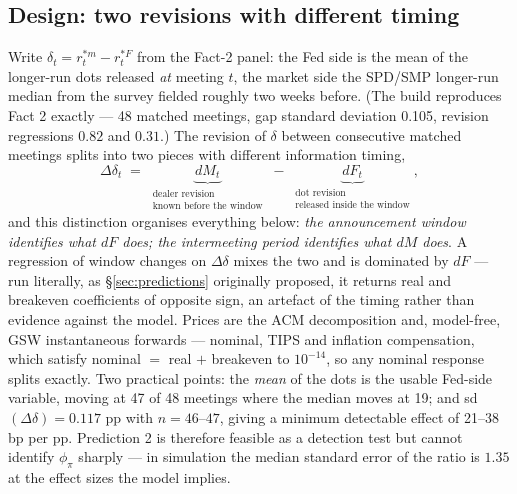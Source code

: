 \documentclass[11pt]{article}
\begin{document}
\subsection{Design: two revisions with different timing}
\label{sec:test-design}
Write $\delta_t=r^{*m}_t-r^{*F}_t$ from the Fact-2 panel: the Fed side is the mean of the
longer-run dots released \emph{at} meeting $t$, the market side the SPD/SMP longer-run median
from the survey fielded roughly two weeks before. (The build reproduces Fact 2 exactly ---
48 matched meetings, gap standard deviation 0.105, revision regressions $0.82$ and $0.31$.) The
revision of $\delta$ between consecutive matched meetings splits into two pieces with different
information timing,
\[
\Delta\delta_t \;=\; \underbrace{dM_t}_{\substack{\text{dealer revision}\\ \text{known before the window}}}
\;-\; \underbrace{dF_t}_{\substack{\text{dot revision}\\ \text{released inside the window}}},
\]
and this distinction organises everything below: \emph{the announcement window identifies what
$dF$ does; the intermeeting period identifies what $dM$ does}. A regression of window changes on
$\Delta\delta$ mixes the two and is dominated by $dF$ --- run literally, as
\S\ref{sec:predictions} originally proposed, it returns real and breakeven coefficients of
opposite sign, an artefact of the timing rather than evidence against the model. Prices are the ACM decomposition and, model-free, GSW instantaneous
forwards --- nominal, TIPS and inflation compensation, which satisfy nominal $=$ real $+$
breakeven to $10^{-14}$, so any nominal response splits exactly. Two practical points: the
\emph{mean} of the dots is the usable Fed-side variable, moving at 47 of 48 meetings where the
median moves at 19; and sd$(\Delta\delta)=0.117$ pp with $n=46$--$47$, giving a minimum
detectable effect of 21--38 bp per pp. Prediction 2 is therefore feasible as a detection test
but cannot identify $\phi_\pi$ sharply --- in simulation the median standard error of the ratio
is $1.35$ at the effect sizes the model implies.
\end{document}
